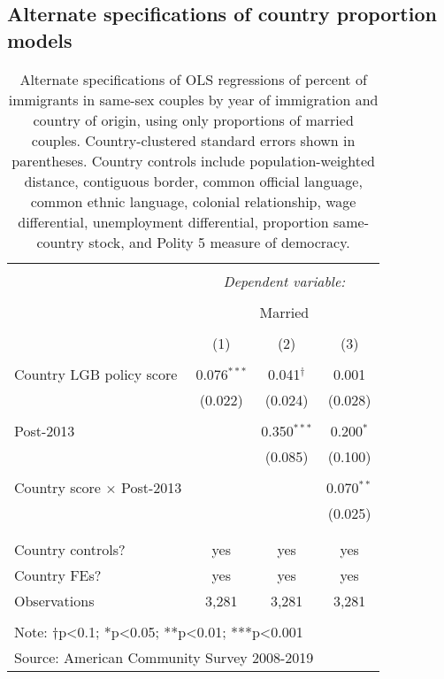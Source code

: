 \documentclass[
  11pt,
]{article}
\begin{document}
\newpage

\hypertarget{alternate-specifications-of-country-proportion-models}{%
\subsection{Alternate specifications of country proportion models}\label{alternate-specifications-of-country-proportion-models}}

\begin{table}[!htbp] \centering 
  \caption{Alternate specifications of OLS regressions of percent of immigrants in same-sex couples by year of immigration and country of origin, using only proportions of married couples. Country-clustered standard errors shown in parentheses. Country controls include population-weighted distance, contiguous border, common official language, common ethnic language, colonial relationship, wage differential, unemployment differential, proportion same-country stock, and Polity 5 measure of democracy.} 
  \label{tab:country-props-alt} 
\begin{tabular}{@{\extracolsep{5pt}}lccc} 
\\[-1.8ex]\hline 
\hline \\[-1.8ex] 
 & \multicolumn{3}{c}{\textit{Dependent variable:}} \\ 
\cline{2-4} 
\\[-1.8ex] & \multicolumn{3}{c}{Married} \\ 
\\[-1.8ex] & (1) & (2) & (3)\\ 
\hline \\[-1.8ex] 
 Country LGB policy score & 0.076$^{***}$ & 0.041$^{†}$ & 0.001 \\ 
  & (0.022) & (0.024) & (0.028) \\ 
  & & & \\ 
 Post-2013 &  & 0.350$^{***}$ & 0.200$^{*}$ \\ 
  &  & (0.085) & (0.100) \\ 
  & & & \\ 
 Country score × Post-2013 &  &  & 0.070$^{**}$ \\ 
  &  &  & (0.025) \\ 
  & & & \\ 
\hline \\[-1.8ex] 
Country controls? & yes & yes & yes \\ 
Country FEs? & yes & yes & yes \\ 
Observations & 3,281 & 3,281 & 3,281 \\ 
\hline 
\hline \\[-1.8ex] 
\multicolumn{4}{l}{Note: †p<0.1; *p<0.05; **p<0.01; ***p<0.001} \\ 
\multicolumn{4}{l}{Source: American Community Survey 2008-2019} \\ 
\end{tabular} 
\end{table}
\end{document}
